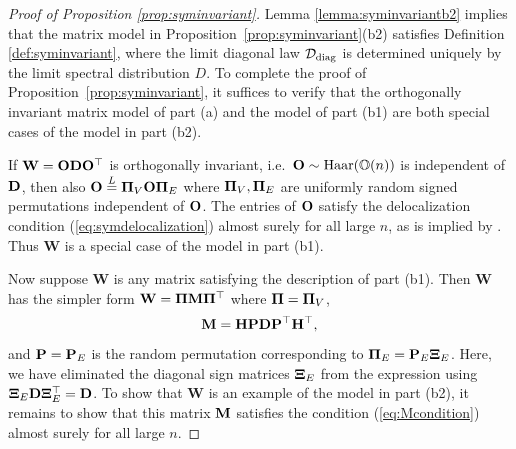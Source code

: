 \documentclass[10pt,reqno]{amsart}
\def\bW{{\mathbf{W}}}
\def\Haar{\operatorname{Haar}}
\def\OO{\mathbb{O}}
\newcommand{\tdiag}{\mathrm{diag}}
\begin{document}
\begin{proof}[Proof of Proposition \ref{prop:syminvariant}]
Lemma \ref{lemma:syminvariantb2} implies that the matrix model
in Proposition~\ref{prop:syminvariant}(b2) satisfies
Definition \ref{def:syminvariant}, where the limit diagonal law $\cD_\tdiag$
is determined uniquely by the limit spectral distribution $D$. To complete the
proof of Proposition~\ref{prop:syminvariant}, it suffices to verify that
the orthogonally invariant matrix model of part (a)
and the model of part (b1) are both special cases of the model in part (b2).

If $\bW=\bO\bD\bO^\top$ is orthogonally invariant, i.e.\ $\bO \sim \Haar(\OO(n))$
is independent of $\mathbf{D}$, then also $\mathbf{O}\overset{L}{=} \bm{\Pi}_V \mathbf{O} \bm{\Pi}_E$ where
$\bm{\Pi}_V,\bm{\Pi}_E$ are uniformly random signed permutations independent of $\mathbf{O}$.
The entries of $\mathbf{O}$ satisfy the delocalization condition
(\ref{eq:symdelocalization}) almost surely for all large $n$,
as is implied by \cite[Theorem 1]{jiang2005maxima}. Thus $\bW$ is a special case
of the model in part (b1).

Now suppose $\bW$ is any matrix satisfying the description of part (b1).
Then $\bW$ has the simpler form $\bW=\bPi\bM\bPi^\top$ where $\bm{\Pi}=\bm{\Pi}_V$,
\[\mathbf{M}=\mathbf{H}\mathbf{P}\mathbf{D}\mathbf{P}^\top \mathbf{H}^\top,\]
and $\mathbf{P}=\mathbf{P}_E$ is the random permutation
corresponding to $\bm{\Pi}_E=\mathbf{P}_E\bm{\Xi}_E$. Here, we have eliminated the diagonal sign
matrices $\bm{\Xi}_E$ from the expression using $\bm{\Xi}_E\mathbf{D}\bm{\Xi}_E^\top=\mathbf{D}$. To show
that $\bW$ is an example of the model in part (b2),
it remains to show that this matrix $\mathbf{M}$ satisfies the condition
(\ref{eq:Mcondition}) almost surely for all large $n$.


\end{proof}
\end{document}
